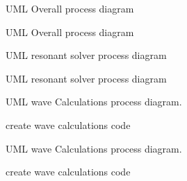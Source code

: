 \begin{DoxyRefList}
\item[\label{todo__todo000018}%
\hypertarget{todo__todo000018}{}%
Page \hyperlink{uml_overall}{Overall Process} ]U\-M\-L Overall process diagram 
\item[\label{todo__todo000006}%
\hypertarget{todo__todo000006}{}%
Page \hyperlink{_u_m_l__overall}{Overall Process} ]U\-M\-L Overall process diagram 
\item[\label{todo__todo000020}%
\hypertarget{todo__todo000020}{}%
Page \hyperlink{uml_resonantsolver}{Resonant Solver Process} ]U\-M\-L resonant solver process diagram 
\item[\label{todo__todo000007}%
\hypertarget{todo__todo000007}{}%
Page \hyperlink{_u_m_l__resonant_solver}{Resonant Solver Process} ]U\-M\-L resonant solver process diagram 
\item[\label{todo__todo000023}%
\hypertarget{todo__todo000023}{}%
Page \hyperlink{uml_wavecalculation}{Wave Calculations Process} ]U\-M\-L wave Calculations process diagram. 

create wave calculations code 
\item[\label{todo__todo000008}%
\hypertarget{todo__todo000008}{}%
Page \hyperlink{_u_m_l__wave_calculation}{Wave Calculations Process} ]U\-M\-L wave Calculations process diagram. 

create wave calculations code
\end{DoxyRefList}